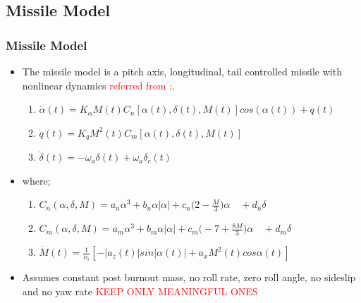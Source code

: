 \documentclass[table,10pt,red]{beamer}	%
\begin{document}
\subsection{Missile Model}
	\begin{frame}
	\frametitle{Missile Model}
	 
 	\begin{itemize}  %
		\item The missile model is a pitch axis,
		longitudinal, tail controlled missile with nonlinear dynamics
		\textcolor{red}{referred from \cite{};}.
		\begin{enumerate}
				\item $\dot{\alpha}(t)=	K_\alpha M(t) C_n [\alpha(t),\delta(t),M(t)]cos(\alpha(t)) + q(t) $
				\item $\dot{q}(t) =	K_q M^2(t) C_m [\alpha(t),\delta(t),M(t)]$\\
				\item $\dot{\delta}(t)	=	-\omega_a\delta(t) + \omega_a\delta_c(t)$
 		\end{enumerate}
		\end{itemize}
	\begin{itemize}
		\item  where;
			\begin{enumerate}
				\item $C_n(\alpha,\delta,M)=a_n\alpha^3+b_n\alpha|\alpha|+c_n\Big(2-\frac{M}{3}\Big)\alpha\quad+ d_n\delta$
				\item $C_m(\alpha,\delta,M)=a_m\alpha^3+b_m\alpha|\alpha|+ c_m\Big(-7+\frac{8M}{3}\Big)\alpha 
				\quad+d_m\delta$
					
				 \item $\dot{M}(t)=\frac{1}{\nu_s}[-|a_z(t)|sin|\alpha(t)|+a_xM^2(t)cos\alpha(t)]$
			\end{enumerate}
	\end{itemize}
	\begin{itemize}
		\item Assumes constant post burnout mass, no roll rate, zero roll angle, no sideslip and no yaw rate \textcolor{red}{KEEP ONLY MEANINGFUL ONES}
\end{itemize}


	\end{frame}
 	
\end{document}
